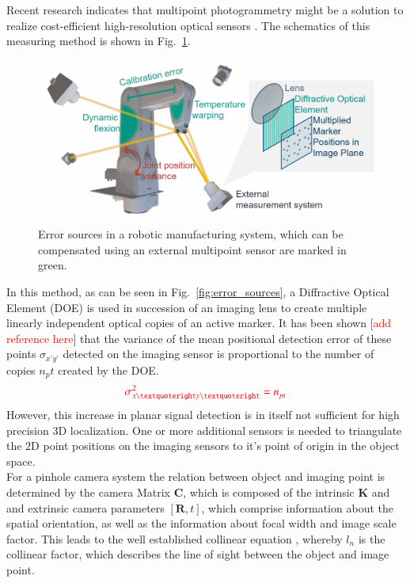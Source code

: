\documentclass[5p,times,procedia]{elsarticle}
\begin{document}
Recent research indicates that multipoint photogrammetry might be a solution to realize cost-efficient high-resolution optical sensors \cite{Hartlieb_2021}.
The schematics of this measuring method is shown in Fig.~\ref{fig:MeasSys_Errors}.
\begin{figure}[h]
	\centering
	\includegraphics[width=\columnwidth]{graphics/error_sources.png}
	\caption{Error sources in a robotic manufacturing system, which can be compensated using an external multipoint  sensor are marked in green.}
	\label{fig:MeasSys_Errors}
\end{figure}
In this method, as can be seen in Fig.~\ref{fig:error_sources}, a Diffractive Optical Element (DOE) is used in succession of an imaging lens to create multiple linearly independent optical copies of an active marker.
It has been shown [\textcolor{red}{add reference here}] that the variance of the mean positional detection error of these points $\sigma_{x’y’}$ detected on the imaging sensor is proportional to the number of copies $n_pt$ created by the DOE.
\begin{equation}
	\textcolor{red}{\sigma_{x’y’}^2 = n_{pt}^{}}
\end{equation}
However, this increase in planar signal detection is in itself not sufficient for high precision 3D localization. One or more additional sensors is needed to triangulate the 2D point positions on the imaging sensors to it’s point of origin in the object space. \\
For a pinhole camera system the relation between object and imaging point is determined by the camera Matrix $\mathbf{C}$, which is composed of the intrinsic $\mathbf{K}$ and  and extrinsic camera parameters $[\mathbf{R}, t]$, which comprise information about the spatial orientation, as well as the information about focal width and
image scale factor. This leads to the well established collinear equation \cite{Luhmann2003}, whereby $l_n$ is the collinear factor, which describes the line of sight between the object and image point.
\end{document}
